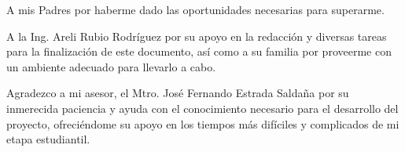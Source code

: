 \begin{thanks}

A mis Padres por haberme dado las oportunidades necesarias para superarme.

A la Ing. Areli Rubio Rodríguez por su apoyo en la redacción y diversas tareas para la finalización de este documento, así como a su familia por proveerme con un ambiente adecuado para llevarlo a cabo.

Agradezco a mi asesor, el Mtro. José Fernando Estrada Saldaña por su inmerecida paciencia y ayuda con el conocimiento necesario para el desarrollo del proyecto, ofreciéndome su apoyo en los tiempos más difíciles y complicados de mi etapa estudiantil.

\end{thanks}
